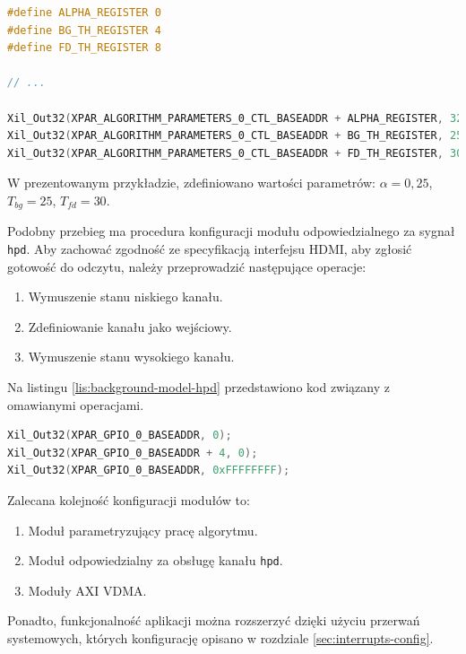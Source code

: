 \begin{lstlisting}[breaklines,language=C, label=lis:background-model-parameters, caption=Konfiguracja modułu parametryzującego generację tła.]
#define ALPHA_REGISTER 0
#define BG_TH_REGISTER 4
#define FD_TH_REGISTER 8

// ...

Xil_Out32(XPAR_ALGORITHM_PARAMETERS_0_CTL_BASEADDR + ALPHA_REGISTER, 32); // 00100000 = 0.25
Xil_Out32(XPAR_ALGORITHM_PARAMETERS_0_CTL_BASEADDR + BG_TH_REGISTER, 25);
Xil_Out32(XPAR_ALGORITHM_PARAMETERS_0_CTL_BASEADDR + FD_TH_REGISTER, 30);
\end{lstlisting}

W prezentowanym przykładzie, zdefiniowano wartości parametrów: $\alpha = 0,25$, $T_{bg} = 25$, $T_{fd} = 30$.

Podobny przebieg ma procedura konfiguracji modułu odpowiedzialnego za sygnał \texttt{hpd}. 
Aby zachować zgodność ze specyfikacją interfejsu HDMI, aby zgłosić gotowość do odczytu, należy przeprowadzić następujące operacje:
\begin{enumerate}
	\item Wymuszenie stanu niskiego kanału.
	\item Zdefiniowanie kanału jako wejściowy.
	\item Wymuszenie stanu wysokiego kanału.
\end{enumerate}

Na listingu \ref{lis:background-model-hpd} przedstawiono kod związany z omawianymi operacjami.

\begin{lstlisting}[breaklines,language=C, label=lis:background-model-hpd, caption=Konfiguracja modułu sterującego kanałem \texttt{hpd}.]
Xil_Out32(XPAR_GPIO_0_BASEADDR, 0);
Xil_Out32(XPAR_GPIO_0_BASEADDR + 4, 0);
Xil_Out32(XPAR_GPIO_0_BASEADDR, 0xFFFFFFFF);
\end{lstlisting}

Zalecana kolejność konfiguracji modułów to:
\begin{enumerate}
	\item Moduł parametryzujący pracę algorytmu.
	\item Moduł odpowiedzialny za obsługę kanału \texttt{hpd}.
	\item Moduły AXI VDMA.
\end{enumerate}

Ponadto, funkcjonalność aplikacji można rozszerzyć dzięki użyciu przerwań systemowych, których konfigurację opisano w rozdziale \ref{sec:interrupts-config}.


